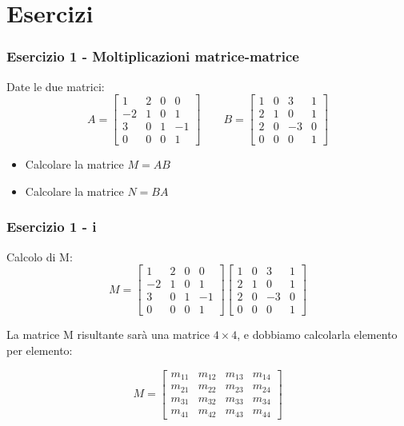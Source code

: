 \documentclass{beamer}
\begin{document}
\section{Esercizi}
%
\begin{frame}
\frametitle{Esercizio 1 - Moltiplicazioni matrice-matrice}
Date le due matrici:
\begin{displaymath}
    A =
\begin{bmatrix}
   1 &  2 &  0 &  0 \\
  -2 &  1 &  0 &  1 \\
   3 &  0 &  1 & -1 \\
   0 &  0 &  0 &  1
\end{bmatrix}
\qquad
B = 
\begin{bmatrix}
   1 &  0 &  3 &  1 \\
   2 &  1 &  0 &  1 \\
   2 &  0 & -3 &  0 \\
   0 &  0 &  0 &  1 
\end{bmatrix}
\end{displaymath}
\begin{itemize}
\item Calcolare la matrice $M = A B$
\item Calcolare la matrice $N = B A$
\end{itemize}
\end{frame}
%
\begin{frame}
\frametitle{Esercizio 1 - i}
Calcolo di M:
\begin{displaymath}
    M =
\begin{bmatrix}
   1 &  2 &  0 &  0 \\
  -2 &  1 &  0 &  1 \\
   3 &  0 &  1 & -1 \\
   0 &  0 &  0 &  1
\end{bmatrix}
\begin{bmatrix}
   1 &  0 &  3 &  1 \\
   2 &  1 &  0 &  1 \\
   2 &  0 & -3 &  0 \\
   0 &  0 &  0 &  1 
\end{bmatrix}
\end{displaymath}

La matrice M risultante sar\`a una matrice $4\times4$, e dobbiamo calcolarla elemento per elemento:

\begin{displaymath}
    M =
\begin{bmatrix}
    m_{11} & m_{12} & m_{13} & m_{14} \\
    m_{21} & m_{22} & m_{23} & m_{24} \\
    m_{31} & m_{32} & m_{33} & m_{34} \\
    m_{41} & m_{42} & m_{43} & m_{44}
\end{bmatrix}
\end{displaymath}

\end{frame}
\end{document}
